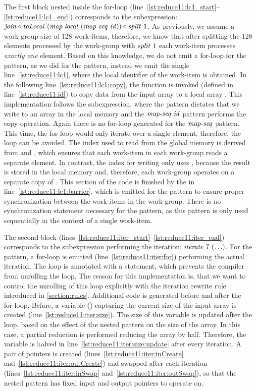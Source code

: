 The first block nested inside the for-loop (line~\ref{lst:reduce11:lc1_start}--\ref{lst:reduce11:lc1_end}) corresponds to the subexpression:
$\text{\textit{join}} \circ \text{\textit{toLocal}}\ (\text{\textit{map-local}}\ (\text{\textit{map-seq}}\ \text{\textit{id}})) \circ \text{\textit{split}}\ 1$.
As previously, we assume a work-group size of 128 work-items, therefore, we know that after splitting the 128 elements processed by the work-group with $\text{\textit{split}}\ 1$ each work-item processes \emph{exactly one} element.
Based on this knowledge, we do not emit a for-loop for the \mapLocal pattern, as we did for the \mapWorkgroup pattern, instead we emit the single line~\ref{lst:reduce11:lc1}, where the local identifier of the work-item is obtained.
In the following line~\ref{lst:reduce11:lc1:copy}, the  function is invoked (defined in line~\ref{lst:reduce11:id}) to copy data from the input array to a local array .
This implementation follows the subexpression, where the \toLocal pattern dictates that we write to an array in the local memory and the $\text{\textit{map-seq}}\ \text{\textit{id}}$ pattern performs the copy operation.
Again there is no for-loop generated for the $\text{\textit{map-seq}}$ pattern.
This time, the for-loop would only iterate over a single element, therefore, the loop can be avoided.
The index used to read from the global memory is derived from  and , which ensures that each work-item in each work-group reads a separate element.
In contrast, the index for writing only uses , because the result is stored in the local memory and, therefore, each work-group operates on a separate copy of .
This section of the code is finished by the  in line~\ref{lst:reduce11:lc1:barrier}, which is emitted for the \mapLocal pattern to ensure proper synchronization between the work-items in the work-group.
There is no synchronization statement necessary for the \mapSeq pattern, as this pattern is only used sequentially in the context of a single work-item.

The second block (lines~\ref{lst:reduce11:iter_start}--\ref{lst:reduce11:iter_end}) corresponds to the subexpression performing the iteration:
$\text{\textit{iterate}}\ 7\ (\ldots)$.
For the \iterateN pattern, a for-loop is emitted (line~\ref{lst:reduce11:iter:for}) performing the actual iteration.
The loop is annotated with a  statement, which prevents the \OpenCL compiler from unrolling the loop.
The reason for this implementation is, that we want to control the unrolling of this loop explicitly with the iteration rewrite rule introduced in \autoref{section:rules}.
Additional code is generated before and after the for-loop.
Before, a variable () capturing the current size of the input array is created (line~\ref{lst:reduce11:iter:size}).
The size of this variable is updated after the loop, based on the effect of the nested pattern on the size of the array.
In this case, a partial reduction is performed reducing the array by half.
Therefore, the  variable is halved in line~\ref{lst:reduce11:iter:size:update} after every iteration.
A pair of pointers is created (lines~\ref{lst:reduce11:iter:inCreate} and~\ref{lst:reduce11:iter:outCreate}) and swapped after each iteration (lines~\ref{lst:reduce11:iter:inSwap} and~\ref{lst:reduce11:iter:outSwap}), so that the nested pattern has fixed input and output pointers to operate on.

